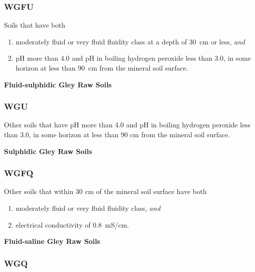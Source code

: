 \documentclass[
  letterpaper,
  DIV=11,
  numbers=noendperiod]{scrreprt}
\providecommand{\tightlist}{%
  \setlength{\itemsep}{0pt}\setlength{\parskip}{0pt}}\usepackage{longtable,booktabs,array}
\begin{document}
\hypertarget{sec-key-WGFU}{%
\subsubsection{\texorpdfstring{\textbf{WGFU}}{WGFU}}\label{sec-key-WGFU}}

Soils that have both

\begin{enumerate}
\def\labelenumi{\arabic{enumi}.}
\tightlist
\item
  moderately fluid or very fluid fluidity class at a depth of 30~cm or
  less, \emph{and}
\item
  pH more than 4.0 and pH in boiling hydrogen peroxide less than 3.0, in
  some horizon at less than 90~cm from the mineral soil surface.
\end{enumerate}

\textbf{Fluid-sulphidic Gley Raw Soils}

\hypertarget{sec-key-WGU}{%
\subsubsection{\texorpdfstring{\textbf{WGU}}{WGU}}\label{sec-key-WGU}}

Other soils that have pH more than 4.0 and pH in boiling hydrogen
peroxide less than 3.0, in some horizon at less than 90 cm from the
mineral soil surface.

\textbf{Sulphidic Gley Raw Soils}

\hypertarget{sec-key-WGFQ}{%
\subsubsection{\texorpdfstring{\textbf{WGFQ}}{WGFQ}}\label{sec-key-WGFQ}}

Other soils that within 30 cm of the mineral soil surface have both

\begin{enumerate}
\def\labelenumi{\arabic{enumi}.}
\tightlist
\item
  moderately fluid or very fluid fluidity class, \emph{and}
\item
  electrical conductivity of 0.8~mS/cm.
\end{enumerate}

\textbf{Fluid-saline Gley Raw Soils}

\hypertarget{sec-key-WGQ}{%
\subsubsection{\texorpdfstring{\textbf{WGQ}}{WGQ}}\label{sec-key-WGQ}}
\end{document}

